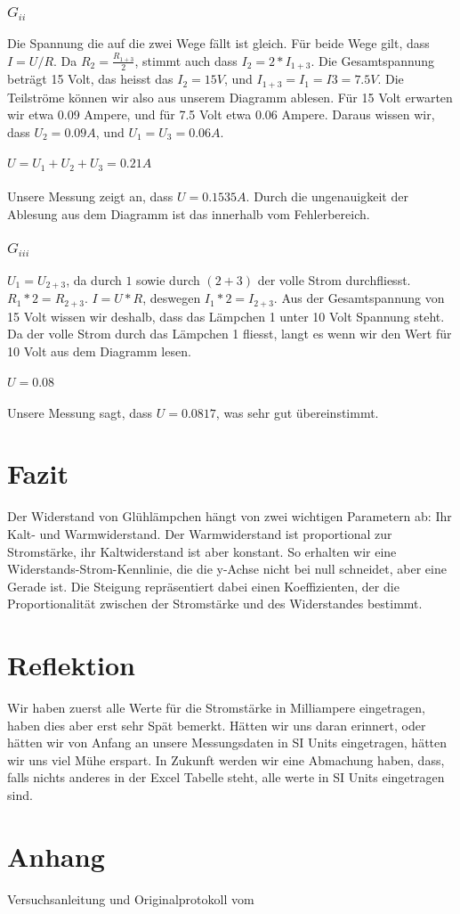 \documentclass[12pt, a4paper, twoside]{article}
\begin{document}
\subsubsection{$G_{ii}$}
Die Spannung die auf die zwei Wege fällt ist gleich.
Für beide Wege gilt, dass $I = U/R$. Da $R_2 = \frac{R_{1+3}}{2}$,
stimmt auch dass $I_2 = 2*I_{1+3}$.
Die Gesamtspannung beträgt 15 Volt, das heisst das $I_2 = 15V$, und $I_{1 + 3} = I_{1} = I{3} = 7.5V$.
Die Teilströme können wir also aus unserem Diagramm ablesen. Für 15 Volt erwarten wir etwa 0.09 Ampere, und für 7.5 Volt etwa 0.06 Ampere.
Daraus wissen wir, dass $U_2 = 0.09A$, und $U_1 = U_3 = 0.06A$. 
\\ 
\\
$U = U_1 + U_2 + U_3 = 0.21A$
\\
\\
Unsere Messung zeigt an, dass $U = 0.1535A$. Durch die ungenauigkeit der Ablesung aus dem Diagramm ist das innerhalb vom Fehlerbereich.
\subsubsection{$G_{iii}$}
$U_1 = U_{2+3}$, da durch $1$ sowie durch $(2 + 3)$ der volle Strom durchfliesst.
$R_1*2 = R_{2+3}$. $I = U * R$, deswegen $I_1 * 2 = I_{2 + 3}$.
Aus der Gesamtspannung von 15 Volt wissen wir deshalb, dass das Lämpchen 1 unter 10 Volt Spannung steht.
Da der volle Strom durch das Lämpchen 1 fliesst, langt es wenn wir den Wert für 10 Volt aus dem Diagramm lesen.
\\
\\
$U = 0.08$
\\
\\
Unsere Messung sagt, dass $U = 0.0817$, was sehr gut übereinstimmt.

\section{Fazit}
Der Widerstand von Glühlämpchen hängt von zwei wichtigen Parametern ab:
Ihr Kalt- und Warmwiderstand. Der Warmwiderstand ist proportional zur Stromstärke, ihr Kaltwiderstand ist aber konstant.
So erhalten wir eine Widerstands-Strom-Kennlinie, die die y-Achse nicht bei null schneidet, aber eine Gerade ist.
Die Steigung repräsentiert dabei einen Koeffizienten, der die Proportionalität zwischen der Stromstärke und des Widerstandes bestimmt.
\section{Reflektion}
Wir haben zuerst alle Werte für die Stromstärke in Milliampere eingetragen, haben dies aber erst sehr Spät bemerkt.
Hätten wir uns daran erinnert, oder hätten wir von Anfang an unsere Messungsdaten in SI Units eingetragen, hätten wir uns viel Mühe erspart.
In Zukunft werden wir eine Abmachung haben, dass, falls nichts anderes in der Excel Tabelle steht, alle werte in SI Units eingetragen sind.
\section{Anhang}
Versuchsanleitung und Originalprotokoll vom \labdate
\end{document}
